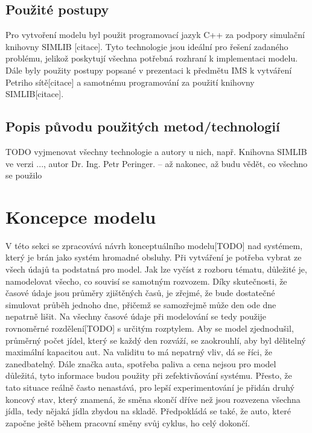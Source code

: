 \documentclass[a4paper, 11pt]{article}
\begin{document}
	\subsection{Použité postupy}

	Pro vytvoření modelu byl použit programovací jazyk C++ za podpory simulační knihovny SIMLIB [citace]. Tyto technologie jsou ideální pro řešení zadaného problému, jelikož poskytují všechna potřebná rozhraní k implementaci modelu. Dále byly použity postupy popsané v prezentaci k předmětu IMS k vytváření Petriho sítě[citace] a samotnému programování za použití knihovny SIMLIB[citace].

	\subsection{Popis původu použitých metod/technologií}

	TODO vyjmenovat všechny technologie a autory u nich, např. Knihovna SIMLIB ve verzi ..., autor Dr. Ing. Petr Peringer.
	-- až nakonec, až budu vědět, co všechno se použilo



	\section{Koncepce modelu}

	V této sekci se zpracovává návrh konceptuálního modelu[TODO] nad systémem, který je brán jako systém hromadné obsluhy. Při vytváření je potřeba vybrat ze všech údajů ta podstatná pro model. Jak lze vyčíst z rozboru tématu, důležité je, namodelovat všecho, co souvisí se samotným rozvozem. Díky skutečnosti, že časové údaje jsou průměry zjištěných časů, je zřejmé, že bude dostatečné simulovat průběh jednoho dne, přičemž se samozřejmě může den ode dne nepatrně lišit. Na všechny časové údaje při modelování se tedy použije rovnoměrné rozdělení[TODO] s určitým rozptylem. Aby se model zjednodušil, průměrný počet jídel, který se každý den rozváží, se zaokrouhlí, aby byl dělitelný maximální kapacitou aut. Na validitu to má nepatrný vliv, dá se říci, že zanedbatelný. Dále značka auta, spotřeba paliva a cena nejsou pro model důležitá, tyto informace budou použity při zefektivňování systému. Přesto, že tato situace reálně často nenastává, pro lepší experimentování je přidán druhý koncový stav, který znamená, že směna skončí dříve než jsou rozvezena všechna jídla, tedy nějaká jídla zbydou na skladě. Předpokládá se také, že auto, které započne ještě během pracovní směny svůj cyklus, ho celý dokončí.
\end{document}
